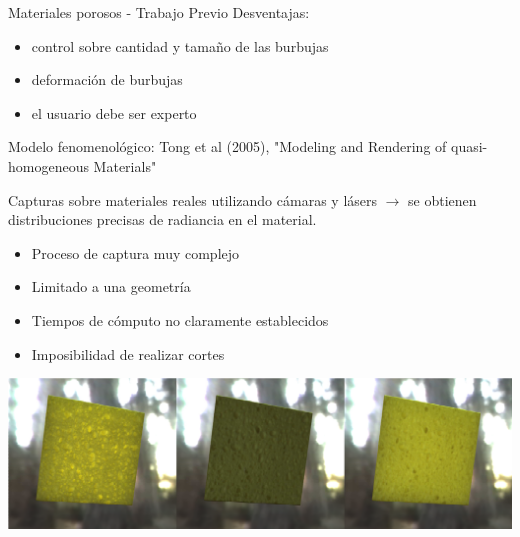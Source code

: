 \documentclass[spanish,unknownkeysallowed]{beamer}
\begin{document}
\begin{frame}{Materiales porosos - Trabajo Previo}
Desventajas: 
\begin{block}{}
\begin{itemize}
\item control sobre cantidad y tamaño de las burbujas
\item deformación de burbujas
\item el usuario debe ser experto
\end{itemize}
\end{block}


\end{frame}

\begin{frame}

Modelo fenomenológico: Tong et al (2005), "Modeling and Rendering of quasi-homogeneous Materials"

Capturas sobre materiales reales utilizando cámaras y lásers $\rightarrow$ se obtienen distribuciones precisas de radiancia en el material.

\begin{itemize}
\item Proceso de captura muy complejo
\item Limitado a una geometría
\item Tiempos de cómputo no claramente establecidos
\item Imposibilidad de realizar cortes
\end{itemize}

\includegraphics[scale = 0.3]{../figures/esponja}

\end{frame}
\end{document}
